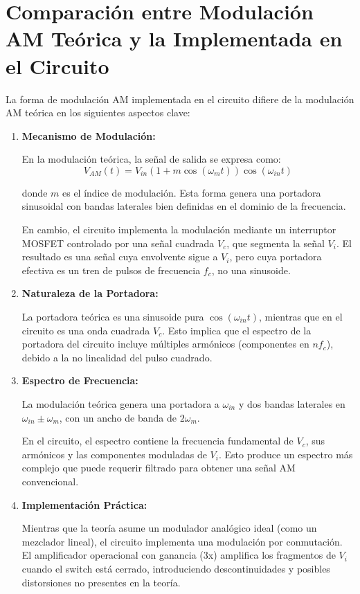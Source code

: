 \section{Comparación entre Modulación AM Teórica y la Implementada en el Circuito}

La forma de modulación AM implementada en el circuito difiere de la modulación AM teórica en los siguientes aspectos clave:

\begin{enumerate}
    \item \textbf{Mecanismo de Modulación:}

          En la modulación teórica, la señal de salida se expresa como:
          \begin{equation*}
              V_{AM}(t) = V_{in} \left(1 + m \cos(\omega_m t)\right) \cos(\omega_{in} t)
          \end{equation*}

          donde $ m $ es el índice de modulación. Esta forma genera una portadora sinusoidal con bandas laterales bien definidas en el dominio de la frecuencia.

          En cambio, el circuito implementa la modulación mediante un interruptor MOSFET controlado por una señal cuadrada $ V_c $, que segmenta la señal $ V_i $. El resultado es una señal cuya envolvente sigue a $ V_i $, pero cuya portadora efectiva es un tren de pulsos de frecuencia $ f_c $, no una sinusoide.

    \item \textbf{Naturaleza de la Portadora:}

          La portadora teórica es una sinusoide pura $ \cos(\omega_{in} t) $, mientras que en el circuito es una onda cuadrada $ V_c $. Esto implica que el espectro de la portadora del circuito incluye múltiples armónicos (componentes en $ nf_c $), debido a la no linealidad del pulso cuadrado.

    \item \textbf{Espectro de Frecuencia:}

          La modulación teórica genera una portadora a $ \omega_{in} $ y dos bandas laterales en $ \omega_{in} \pm \omega_m $, con un ancho de banda de $ 2\omega_m $.

          En el circuito, el espectro contiene la frecuencia fundamental de $ V_c $, sus armónicos y las componentes moduladas de $ V_i $. Esto produce un espectro más complejo que puede requerir filtrado para obtener una señal AM convencional.

    \item \textbf{Implementación Práctica:}

          Mientras que la teoría asume un modulador analógico ideal (como un mezclador lineal), el circuito implementa una modulación por conmutación. El amplificador operacional con ganancia (3x) amplifica los fragmentos de $ V_i $ cuando el switch está cerrado, introduciendo descontinuidades y posibles distorsiones no presentes en la teoría.
\end{enumerate}

